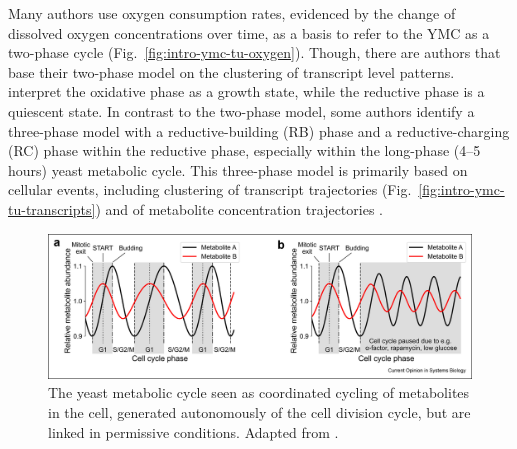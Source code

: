 Many authors \parencite{slavovMetabolicCyclingCell2011, murrayRedoxRegulationRespiring2011, caustonMetabolicRhythmsFramework2018} use oxygen consumption rates, evidenced by the change of dissolved oxygen concentrations over time, as a basis to refer to the YMC as a two-phase cycle (Fig.\ \ref{fig:intro-ymc-tu-oxygen}).
Though, there are authors \parencite{machneYinYangYeast2012} that base their two-phase model on the clustering of transcript level patterns.
\textcite{krishnaMinimalPushPull2018} interpret the oxidative phase as a growth state, while the reductive phase is a quiescent state.
In contrast to the two-phase model, some authors identify a three-phase model with a reductive-building (RB) phase and a reductive-charging (RC) phase within the reductive phase, especially within the long-phase (4--5 hours) yeast metabolic cycle.
This three-phase model is primarily based on cellular events, including clustering of transcript trajectories \parencite{tuLogicYeastMetabolic2005} (Fig.\ \ref{fig:intro-ymc-tu-transcripts}) and of metabolite concentration trajectories \parencite{tuCyclicChangesMetabolic2007}.

\begin{figure}
  \centering
  \includegraphics[width=1.0\textwidth]{zylstraMetabolicDynamicsCell2022_1}
  \caption[
    The yeast metabolic cycle seen as coordinated cycling of metabolites in the cell
  ]{
    The yeast metabolic cycle seen as coordinated cycling of metabolites in the cell, generated autonomously of the cell division cycle, but are linked in permissive conditions.
    Adapted from \textcite{zylstraMetabolicDynamicsCell2022}.}
  \label{fig:intro-ymc-overview-ss}
\end{figure}


